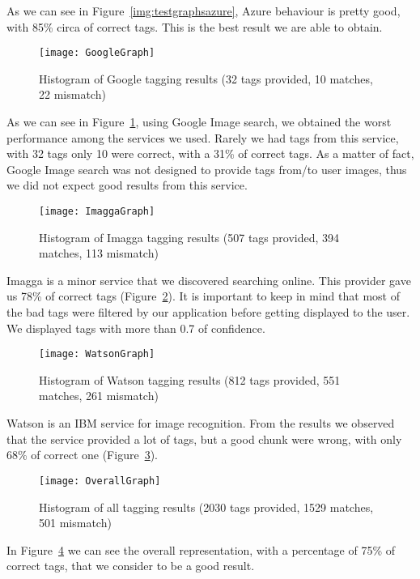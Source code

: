 As we can see in Figure~\ref{img:testgraphsazure}, Azure behaviour is pretty 
good, with 85\% circa of correct tags. This is the best result we are able to 
obtain.

\begin{figure}[H]
\centering
\texttt{[image: GoogleGraph]}
\caption{Histogram of Google tagging results (32 tags provided, 10 matches, 22 
mismatch)}
\label{img:testgraphgoogle}
\end{figure}

As we can see in Figure~\ref{img:testgraphgoogle}, using Google Image search, we 
obtained the worst performance among the services we used. Rarely we had tags 
from this service, with 32 tags only 10 were correct, with a 31\% of correct 
tags. As a matter of fact, Google Image search was not designed to provide tags 
from/to user images, thus we did not expect good results from this service.

\begin{figure}[H]
\centering
\texttt{[image: ImaggaGraph]}
\caption{Histogram of Imagga tagging results (507 tags provided, 394 matches, 
113 mismatch)}
\label{img:testgraphimagga}
\end{figure}

Imagga is a minor service that we discovered searching online. This provider 
gave us 78\% of correct tags (Figure~\ref{img:testgraphimagga}). It is important 
to keep in mind that most of the bad tags were filtered by our application 
before getting displayed to the user. We displayed tags with more than 0.7 of 
confidence.

\begin{figure}[H]
\centering
\texttt{[image: WatsonGraph]}
\caption{Histogram of Watson tagging results (812 tags provided, 551 matches, 
261 mismatch)}
\label{img:testgraphwatson}
\end{figure}

Watson is an IBM service for image recognition. From the results we observed 
that the service provided a lot of tags, but a good chunk were wrong, with only 
68\% of correct one (Figure~\ref{img:testgraphwatson}).

\begin{figure}[H]
\centering
\texttt{[image: OverallGraph]}
\caption{Histogram of all tagging results (2030 tags provided, 1529 matches, 501 
mismatch)}
\label{img:testgraphoverall}
\end{figure}

In Figure~\ref{img:testgraphoverall} we can see the overall representation, with 
a percentage of 75\% of correct tags, that we consider to be a good result.

